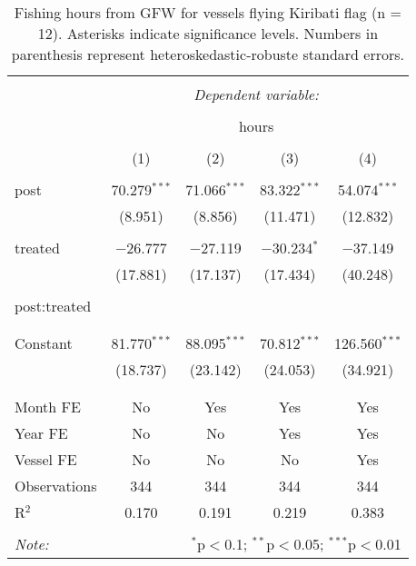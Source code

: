 \documentclass[]{article}
\theoremstyle{definition}
\theoremstyle{definition}
\theoremstyle{definition}
\theoremstyle{remark}
\begin{document}
\begin{table}[!htbp] \centering 
  \caption{\label{tab:kir_vessels}Fishing hours from GFW for vessels flying Kiribati flag (n = 12). Asterisks indicate significance levels. Numbers in parenthesis represent heteroskedastic-robuste standard errors.} 
  \label{} 
\begin{tabular}{@{\extracolsep{5pt}}lcccc} 
\\[-1.8ex]\hline 
\hline \\[-1.8ex] 
 & \multicolumn{4}{c}{\textit{Dependent variable:}} \\ 
\cline{2-5} 
\\[-1.8ex] & \multicolumn{4}{c}{hours} \\ 
\\[-1.8ex] & (1) & (2) & (3) & (4)\\ 
\hline \\[-1.8ex] 
 post & 70.279$^{***}$ & 71.066$^{***}$ & 83.322$^{***}$ & 54.074$^{***}$ \\ 
  & (8.951) & (8.856) & (11.471) & (12.832) \\ 
  & & & & \\ 
 treated & $-$26.777 & $-$27.119 & $-$30.234$^{*}$ & $-$37.149 \\ 
  & (17.881) & (17.137) & (17.434) & (40.248) \\ 
  & & & & \\ 
 post:treated &  &  &  &  \\ 
  &  &  &  &  \\ 
  & & & & \\ 
 Constant & 81.770$^{***}$ & 88.095$^{***}$ & 70.812$^{***}$ & 126.560$^{***}$ \\ 
  & (18.737) & (23.142) & (24.053) & (34.921) \\ 
  & & & & \\ 
\hline \\[-1.8ex] 
Month FE & No & Yes & Yes & Yes \\ 
Year FE & No & No & Yes & Yes \\ 
Vessel FE & No & No & No & Yes \\ 
Observations & 344 & 344 & 344 & 344 \\ 
R$^{2}$ & 0.170 & 0.191 & 0.219 & 0.383 \\ 
\hline 
\hline \\[-1.8ex] 
\textit{Note:}  & \multicolumn{4}{r}{$^{*}$p$<$0.1; $^{**}$p$<$0.05; $^{***}$p$<$0.01} \\ 
\end{tabular} 
\end{table}
\end{document}
